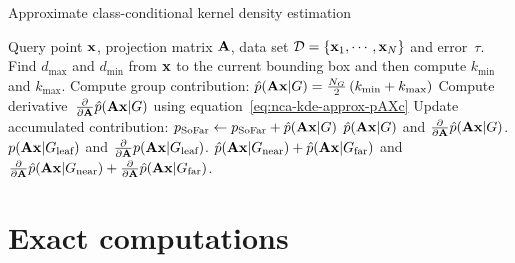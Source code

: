 	\begin{algorithm}
		\caption{Approximate class-conditional kernel density estimation} 
		\label{alg:approx-cc-kde}  
		\begin{algorithmic}[1]                    %
			\REQUIRE Query point $\mathbf{x}$, projection matrix $\mathbf{A}$, data set
$\mathcal{D}=\{\mathbf{x}_1,\cdots,\mathbf{x}_N\}$ and error~$\tau$.
			\STATE Find $d_{\max}$ and $d_{\min}$ from $\mathbf{x}$ to the current bounding box and then compute $k_{\min}$ and $k_{\max}$.
				\STATE Compute group contribution: {$\hat{p}(\mathbf{A}\mathbf{x}|G) = \frac{N_G}{2}\left( k_{\min} + k_{\max} \right)$}
				\STATE Compute derivative~$\frac{\partial}{\partial\mathbf{A}}\hat{p}(\mathbf{A}\mathbf{x}|G)$ using equation~\eqref{eq:nca-kde-approx-pAXc}
				\STATE Update accumulated contribution: $p_{\text{SoFar}}\leftarrow p_{\text{SoFar}}+\hat{p}(\mathbf{A}\mathbf{x}|G)$
				\RETURN  $\hat{p}(\mathbf{A}\mathbf{x}|G)$ and $\frac{\partial}{\partial\mathbf{A}}\hat{p}(\mathbf{A}\mathbf{x}|G)$.
			\ENDIF
				\RETURN  $p(\mathbf{A}\mathbf{x}|G_\text{leaf})$ and $\frac{\partial}{\partial\mathbf{A}}p(\mathbf{A}\mathbf{x}|G_\text{leaf})$.
			\ENDIF
			\RETURN $\hat{p}(\mathbf{A}\mathbf{x}|G_{\text{near}}) + \hat{p}(\mathbf{A}\mathbf{x}|G_{\text{far}})$ and $\frac{\partial}{\partial\mathbf{A}}\hat{p}(\mathbf{A}\mathbf{x}|G_{\text{near}})+\frac{\partial}{\partial\mathbf{A}}\hat{p}(\mathbf{A}\mathbf{x}|G_{\text{far}})$.
		\end{algorithmic}
	\end{algorithm}
	
	
\section{Exact computations}
\label{sec:exact-computations}

